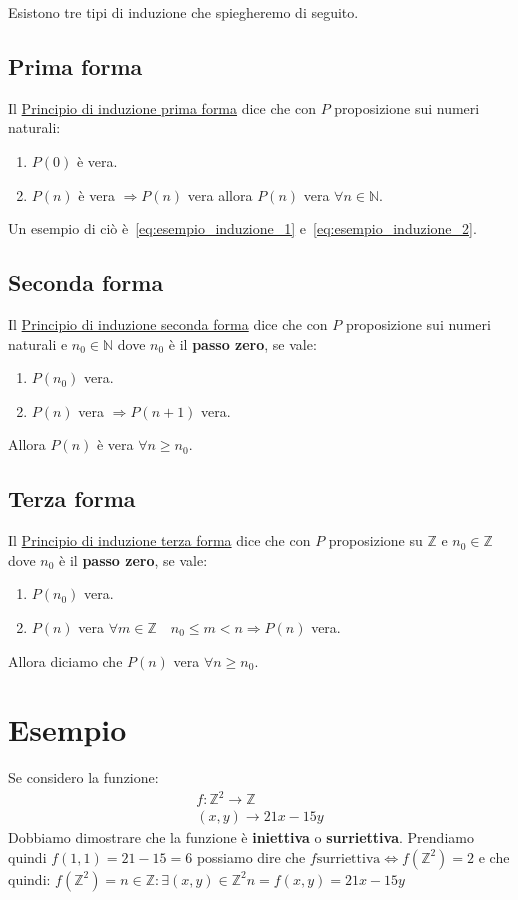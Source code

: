 \documentclass{article}
\begin{document}
Esistono tre tipi di induzione che spiegheremo di seguito.


\subsection{Prima forma}
Il \underline{Principio di induzione prima forma} dice che con $P$ proposizione sui numeri naturali:
\begin{enumerate}
        \item $P(0)$ è vera. 
        \item $P(n)$ è vera $\Rightarrow P(n)$ vera allora $P(n)$ vera $\forall n \in \mathbb{N}$. 
\end{enumerate}
Un esempio di ciò è~\ref{eq:esempio_induzione_1} e~\ref{eq:esempio_induzione_2}.


\subsection{Seconda forma}
Il \underline{Principio di induzione seconda forma} dice che con $P$ proposizione sui numeri naturali e $n_0 \in \mathbb{N}$ dove $n_0$ è il \textbf{passo zero}, se vale:
\begin{enumerate}
        \item $P(n_0)$ vera.
        \item $P(n)$ vera $\Rightarrow P(n+1)$ vera.
\end{enumerate}
Allora $P(n)$ è vera $\forall n \ge n_0$.

\subsection{Terza forma}
Il \underline{Principio di induzione terza forma} dice che con $P$ proposizione su $\mathbb{Z}$ e $n_0 \in \mathbb{Z}$ dove $n_0$ è il \textbf{passo zero}, se vale:
\begin{enumerate}
        \item $P(n_0)$ vera. 
        \item $P(n)$ vera $\forall m \in \mathbb{Z} \quad n_0 \le m < n \Rightarrow P(n)$ vera. 
\end{enumerate}
Allora diciamo che $P(n)$ vera $\forall n \ge n_0$.




\newpage
\section{Esempio}
Se considero la funzione:
\begin{align}
        f :  \mathbb{Z}^{2} \rightarrow \mathbb{Z} \\
        (x,y) \rightarrow 21x - 15y
\end{align}
Dobbiamo dimostrare che la funzione è \textbf{iniettiva} o \textbf{surriettiva}.
Prendiamo quindi $f(1,1) = 21 - 15 = 6$ possiamo dire che \newline
$f \textrm{surriettiva} \Leftrightarrow f(\mathbb{Z}^{2}) = 2$
e che quindi:
$f(\mathbb{Z}^{2}) = {n \in \mathbb{Z} : \exists(x,y) \in \mathbb{Z}^{2} n=f(x,y)=21x - 15y} $
\end{document}
